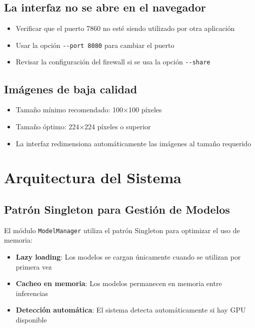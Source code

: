 \subsection{La interfaz no se abre en el navegador}

\begin{itemize}
    \item Verificar que el puerto 7860 no esté siendo utilizado por otra aplicación
    \item Usar la opción \texttt{-{}-port 8080} para cambiar el puerto
    \item Revisar la configuración del firewall si se usa la opción \texttt{-{}-share}
\end{itemize}

\subsection{Imágenes de baja calidad}

\begin{itemize}
    \item Tamaño mínimo recomendado: 100×100 píxeles
    \item Tamaño óptimo: 224×224 píxeles o superior
    \item La interfaz redimensiona automáticamente las imágenes al tamaño requerido
\end{itemize}

\section{Arquitectura del Sistema}

\subsection{Patrón Singleton para Gestión de Modelos}

El módulo \texttt{ModelManager} utiliza el patrón Singleton para optimizar el uso de memoria:
\begin{itemize}
    \item \textbf{Lazy loading}: Los modelos se cargan únicamente cuando se utilizan por primera vez
    \item \textbf{Cacheo en memoria}: Los modelos permanecen en memoria entre inferencias
    \item \textbf{Detección automática}: El sistema detecta automáticamente si hay GPU disponible
\end{itemize}

